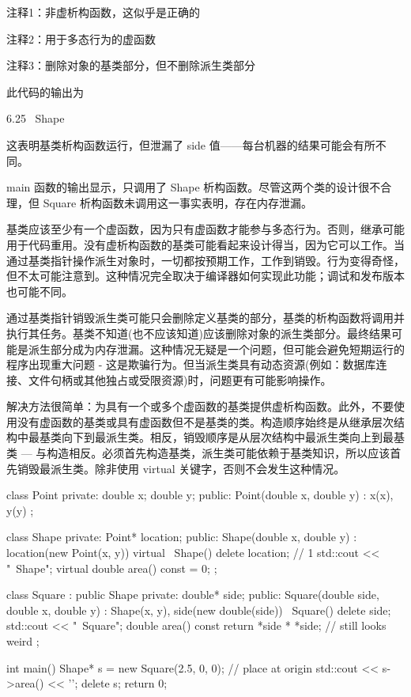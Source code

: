 {\footnotesize
注释1：非虚析构函数，这似乎是正确的

注释2：用于多态行为的虚函数

注释3：删除对象的基类部分，但不删除派生类部分
}

此代码的输出为

\begin{shell}
6.25
~Shape
\end{shell}

这表明基类析构函数运行，但泄漏了 side 值——每台机器的结果可能会有所不同。


main 函数的输出显示，只调用了 Shape 析构函数。尽管这两个类的设计很不合理，但 Square 析构函数未调用这一事实表明，存在内存泄漏。

基类应该至少有一个虚函数，因为只有虚函数才能参与多态行为。否则，继承可能用于代码重用。没有虚析构函数的基类可能看起来设计得当，因为它可以工作。当通过基类指针操作派生对象时，一切都按预期工作，工作到销毁。行为变得奇怪，但不太可能注意到。这种情况完全取决于编译器如何实现此功能；调试和发布版本也可能不同。

通过基类指针销毁派生类可能只会删除定义基类的部分，基类的析构函数将调用并执行其任务。基类不知道(也不应该知道)应该删除对象的派生类部分。最终结果可能是派生部分成为内存泄漏。这种情况无疑是一个问题，但可能会避免短期运行的程序出现重大问题 - 这是欺骗行为。但当派生类具有动态资源(例如：数据库连接、文件句柄或其他独占或受限资源)时，问题更有可能影响操作。


解决方法很简单：为具有一个或多个虚函数的基类提供虚析构函数。此外，不要使用没有虚函数的基类或具有虚函数但不是基类的类。构造顺序始终是从继承层次结构中最基类向下到最派生类。相反，销毁顺序是从层次结构中最派生类向上到最基类 — 与构造相反。必须首先构造基类，派生类可能依赖于基类知识，所以应该首先销毁最派生类。除非使用 virtual 关键字，否则不会发生这种情况。


\begin{cpp}
class Point {
private:
  double x;
  double y;
public:
  Point(double x, double y) : x(x), y(y) {}
};

class Shape {
private:
  Point* location;
public:
  Shape(double x, double y) : location(new Point(x, y)) {}
  virtual ~Shape() { delete location; // 1
  std::cout << "~Shape\n"; }
  virtual double area() const = 0;
};

class Square : public Shape {
private:
  double* side;
public:
  Square(double side, double x, double y) : Shape(x, y),
    side(new double(side)) {}
  ~Square() { delete side; std::cout << "~Square\n"; }
  double area() const { return *side * *side; } // still looks weird
};

int main() {
  Shape* s = new Square(2.5, 0, 0); // place at origin
  std::cout << s->area() << '\n';
  delete s;
  return 0;
}
\end{cpp}

